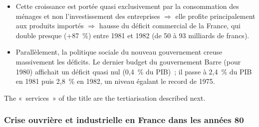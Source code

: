 \begin{itemize}
  \item Cette croissance est portée quasi exclusivement par la consommation des ménages
    et non l'investissement des entreprises $\Rightarrow$ elle profite
    principalement aux produits importés $\Rightarrow$ hausse du déficit commercial de
    la France, qui double presque (+87~\%) entre 1981 et 1982 (de 50 à 93 milliards de
    francs).
  \item Parallèlement, la politique sociale du nouveau gouvernement creuse massivement
    les déficits. Le dernier budget du gouvernement Barre (pour 1980) affichait un
    déficit quasi nul (0,4~\% du PIB)~; il passe à 2,4~\% du PIB en 1981 puis 2,8~\% en
    1982, un niveau égalant le record de 1975.
\end{itemize}
The «~services~» of the title are the tertiarisation described next.

\subsubsection{Crise ouvrière et industrielle en France dans les années 80}

